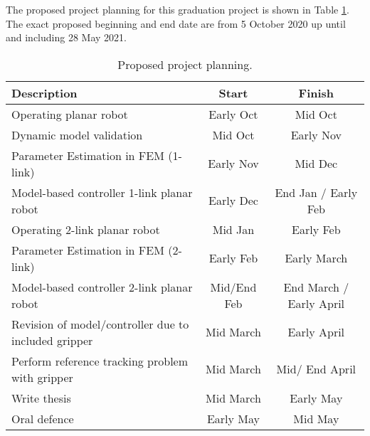 The proposed project planning for this graduation project is shown in Table \ref{tab1:projectplanning}. The exact proposed beginning and end date are from 5 October 2020 up until and including 28 May 2021.






\begin{table}[H]
    \centering
    \begin{tabular}{|p{6cm}|c|c|} \hline
      \textbf{Description}                        & \textbf{Start}    & \textbf{Finish}    \\ \hline
      Operating planar robot                      & Early Oct         & Mid Oct\\  \hline
      Dynamic model validation                    & Mid Oct           & Early Nov\\  \hline
      Parameter Estimation in FEM (1-link)        & Early Nov         & Mid Dec \\  \hline
      Model-based controller 1-link planar robot  & Early Dec         & End Jan / Early Feb\\  \hline
      Operating 2-link planar robot               & Mid Jan           & Early Feb \\  \hline
      Parameter Estimation in FEM (2-link)        & Early Feb         & Early March \\  \hline
      Model-based controller 2-link planar robot  & Mid/End Feb       & End March / Early April \\  \hline
      Revision of model/controller due to included gripper & Mid March& Early April \\  \hline
      Perform reference tracking problem with gripper   & Mid March   &  Mid/ End April \\  \hline
      Write thesis                                & Mid March         & Early May \\  \hline
      Oral defence                                & Early May         & Mid May \\ \hline
    \end{tabular}
    \caption{Proposed project planning.}
    \label{tab1:projectplanning}
\end{table}
